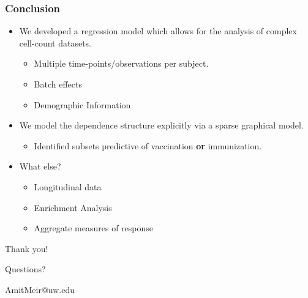 \documentclass{beamer}
\theoremstyle{definition}
\begin{document}
\begin{frame}
\frametitle{Conclusion}
\begin{itemize}
\item We developed a regression model which allows for the analysis of complex cell-count datasets.
	\begin{itemize}
	\item Multiple time-points/observations per subject. 
	\item Batch effects
	\item Demographic Information
	\end{itemize}

\vspace{0.7 cm}
\item  We model the dependence structure explicitly via a sparse graphical model.
	\begin{itemize}
	\item Identified subsets predictive of vaccination \textbf{or} immunization.	
	\end{itemize}
	
\vspace{0.7 cm}
\item  What else?
	\begin{itemize}
	\item Longitudinal data
	\item Enrichment Analysis
	\item Aggregate measures of response
	\end{itemize}
\end{itemize}
\end{frame}


\begin{frame}
\begin{center}
\huge{Thank you!}

\vspace{2 cm}
\LARGE{Questions?}

\vspace{1cm}
\large{AmitMeir@uw.edu}
\end{center}
\end{frame}

\end{document}
